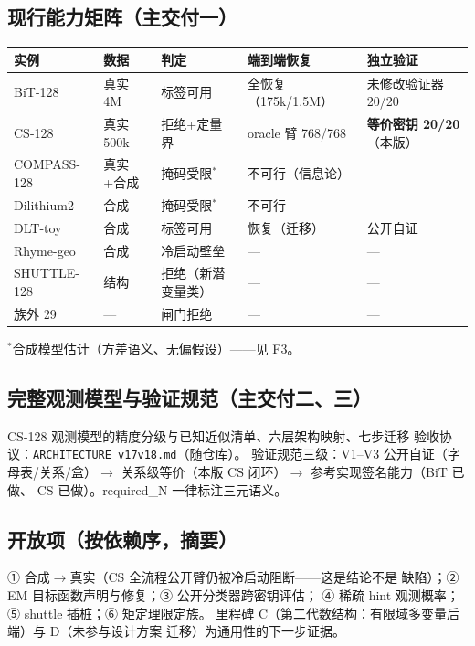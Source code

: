 \documentclass[11pt,a4paper]{ctexart}
\begin{document}
\subsection{现行能力矩阵（主交付一）}

\begin{table}[htbp]\centering\small
\begin{tabular}{@{}lllll@{}}
\toprule
实例 & 数据 & 判定 & 端到端恢复 & 独立验证 \\
\midrule
BiT-128 & 真实 4M & 标签可用 & 全恢复（175k/1.5M） & 未修改验证器 20/20 \\
CS-128 & 真实 500k & 拒绝+定量界 & oracle 臂 768/768 & \textbf{等价密钥 20/20}（本版） \\
COMPASS-128 & 真实+合成 & 掩码受限$^{*}$ & 不可行（信息论） & — \\
Dilithium2 & 合成 & 掩码受限$^{*}$ & 不可行 & — \\
DLT-toy & 合成 & 标签可用 & 恢复（迁移） & 公开自证 \\
Rhyme-geo & 合成 & 冷启动壁垒 & — & — \\
SHUTTLE-128 & 结构 & 拒绝（新潜变量类） & — & — \\
族外 29 & — & 闸门拒绝 & — & — \\
\bottomrule
\end{tabular}
\end{table}
{\small $^{*}$合成模型估计（方差语义、无偏假设）——见 F3。}

\subsection{完整观测模型与验证规范（主交付二、三）}

CS-128 观测模型的精度分级与已知近似清单、六层架构映射、七步迁移
验收协议：\texttt{ARCHITECTURE\_v17v18.md}（随仓库）。
验证规范三级：V1--V3 公开自证（字母表/关系/盒）$\to$
关系级等价（本版 CS 闭环）$\to$ 参考实现签名能力（BiT 已做、
CS 已做）。required\_N 一律标注三元语义。

\subsection{开放项（按依赖序，摘要）}

① 合成$\to$真实（CS 全流程公开臂仍被冷启动阻断——这是结论不是
缺陷）；② EM 目标函数声明与修复；③ 公开分类器跨密钥评估；
④ 稀疏 hint 观测概率；⑤ shuttle 插桩；⑥ 矩定理限定族。
里程碑 C（第二代数结构：有限域多变量后端）与 D（未参与设计方案
迁移）为通用性的下一步证据。
\end{document}
